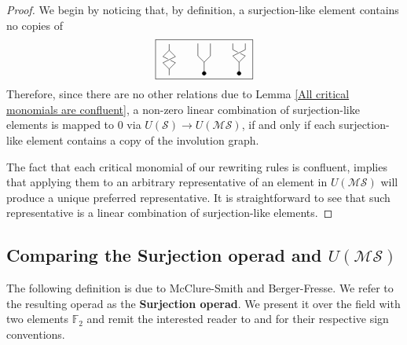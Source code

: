 \documentclass{amsart}
\renewcommand{\S}{\mathcal{S}}
\newcommand{\MS}{\mathcal{MS}}
\newcommand{\F}{\mathbb{F}}
\theoremstyle{definition}
\begin{document}
	\begin{proof}
		We begin by noticing that, by definition, a surjection-like element contains no copies of 
	\begin{equation*}
	\boxed{\ \begin{tikzpicture}[scale=.2]
		\draw (0,5)--(0,4)--(-1,3);
		\draw (-1,3) to (-.2,2.6);
		\draw (1,2)--(.2,2.4);
		\draw (1,2)--(0,1)--(0,0);
		\draw (0,4)--(1,3)--(-1,2)--(0,1);
		\end{tikzpicture}	
		\qquad
		\begin{tikzpicture}[scale=.2]
		\draw (-1,5)--(-1,3)--(0,2)--(0,0);
		\draw (1,5)--(1,3)--(0,2);
		\draw [fill] (0,.2) circle [radius=0.3];
		\end{tikzpicture}
		\qquad
		\begin{tikzpicture}[scale=.2]
		\draw (-1,5)--(-1,4);
		\draw (0,2)--(0,0);
		\draw (1,5)--(1,4)--(-1,3)--(0,2);
		\draw [fill] (0,.2) circle [radius=0.3];
		
		\draw (-1,4) to (-.2,3.6);
		\draw (0,2)--(1,3)--(.2,3.4);
		\end{tikzpicture}\ }
	\end{equation*}
		Therefore, since there are no other relations due to Lemma \ref{All critical monomials are confluent}, a non-zero linear combination of surjection-like elements is mapped to $0$ via $U(\S) \to U(\MS)$, if and only if each surjection-like element contains a copy of the involution graph. 
		
		The fact that each critical monomial of our rewriting rules is confluent, implies that applying them to an arbitrary representative of an element in $U(\MS)$ will produce a unique preferred representative. It is straightforward to see that such representative is a linear combination of surjection-like elements.
	\end{proof}
    
	\subsection{Comparing the Surjection operad and $U(\MS)$} 
	
	The following definition is due to McClure-Smith and Berger-Fresse. We refer to the resulting operad as the \textbf{Surjection operad}. We present it over the field with two elements $\F_2$ and remit the interested reader to \cite{mcclure2003multivariable} and \cite{berger2004combinatorial} for their respective sign conventions. 
	
\end{document}
